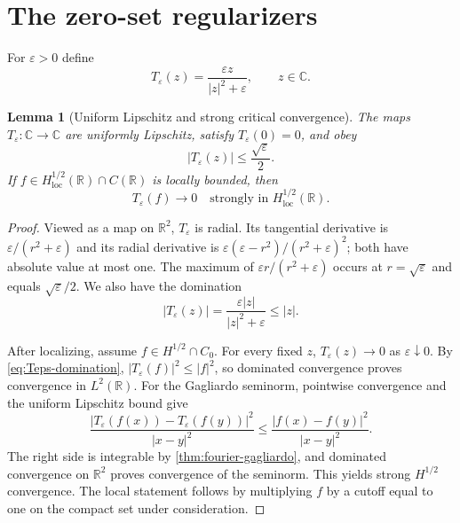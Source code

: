 \documentclass[11pt,oneside]{book}
\newtheorem{lemma}[theorem]{Lemma}
\theoremstyle{definition}
\theoremstyle{remark}
\newcommand{\R}{\mathbb R}
\newcommand{\C}{\mathbb C}
\newcommand{\1}{\mathbf 1}
\newcommand{\loc}{\mathrm{loc}}
\newcommand{\eps}{\varepsilon}
\begin{document}
\section{The zero-set regularizers}
For $\eps>0$ define
\begin{equation}
 T_\eps(z)=\frac{\eps z}{|z|^2+\eps},
 \qquad z\in\C.                                    \label{eq:Teps-def}
\end{equation}

\begin{lemma}[Uniform Lipschitz and strong critical convergence]
\label{lem:Teps}
The maps $T_\eps:\C\to\C$ are uniformly Lipschitz, satisfy
$T_\eps(0)=0$, and obey
\begin{equation}
 |T_\eps(z)|\le\frac{\sqrt\eps}{2}.                \label{eq:Teps-sup}
\end{equation}
If $f\in H^{1/2}_{\loc}(\R)\cap C(\R)$ is locally bounded, then
\begin{equation}
 T_\eps(f)\longrightarrow0
 \quad\text{strongly in }H^{1/2}_{\loc}(\R).       \label{eq:Teps-strong}
\end{equation}
\end{lemma}

\begin{proof}
Viewed as a map on $\R^2$, $T_\eps$ is radial.  Its tangential derivative is
$\eps/(r^2+\eps)$ and its radial derivative is
$\eps(\eps-r^2)/(r^2+\eps)^2$; both have absolute value at most one.  The
maximum of $\eps r/(r^2+\eps)$ occurs at $r=\sqrt\eps$ and equals
$\sqrt\eps/2$.  We also have the domination
\begin{equation}
 |T_\eps(z)|=\frac{\eps|z|}{|z|^2+\eps}\le |z|.    \label{eq:Teps-domination}
\end{equation}

After localizing, assume $f\in H^{1/2}\cap C_0$.  For every fixed $z$,
$T_\eps(z)\to0$ as $\eps\downarrow0$.  By
\eqref{eq:Teps-domination}, $|T_\eps(f)|^2\le|f|^2$, so dominated convergence
proves convergence in $L^2(\R)$.  For the Gagliardo seminorm, pointwise
convergence and the uniform Lipschitz bound give
\[
 \frac{|T_\eps(f(x))-T_\eps(f(y))|^2}{|x-y|^2}
 \le \frac{|f(x)-f(y)|^2}{|x-y|^2}.
\]
The right side is integrable by
\cref{thm:fourier-gagliardo}, and dominated convergence on $\R^2$ proves
convergence of the seminorm.  This yields strong $H^{1/2}$ convergence.  The
local statement follows by multiplying $f$ by a cutoff equal to one on the
compact set under consideration.
\end{proof}
\end{document}
